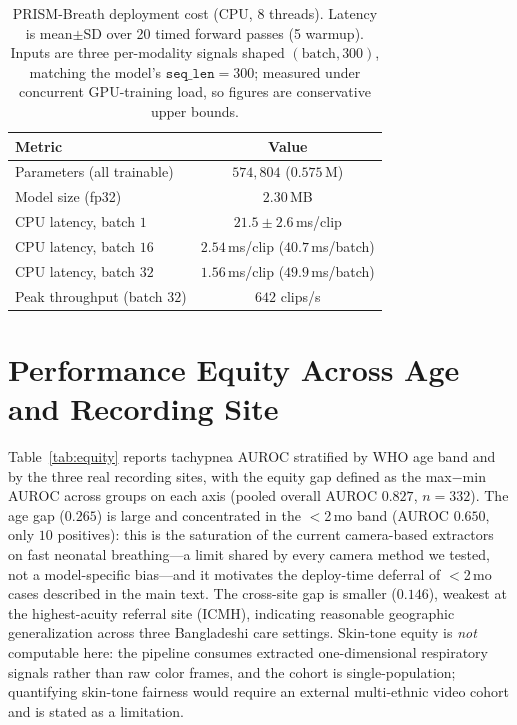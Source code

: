 \begin{table}[!t]
\caption{PRISM-Breath deployment cost (CPU, 8 threads). Latency is mean$\pm$SD over 20 timed forward passes
(5 warmup). Inputs are three per-modality signals shaped $(\text{batch},300)$, matching the model's
$\texttt{seq\_len}{=}300$; measured under concurrent GPU-training load, so figures are conservative upper
bounds.}
\label{tab:edge}\centering\small
\begin{tabular}{@{}lc@{}}\toprule
Metric & Value\\\midrule
Parameters (all trainable)      & $574{,}804$ \;($0.575$\,M) \\
Model size (fp32)               & $2.30$\,MB \\
CPU latency, batch $1$          & $21.5 \pm 2.6$\,ms/clip \\
CPU latency, batch $16$         & $2.54$\,ms/clip \;($40.7$\,ms/batch) \\
CPU latency, batch $32$         & $1.56$\,ms/clip \;($49.9$\,ms/batch) \\
Peak throughput (batch $32$)    & $642$ clips/s \\\bottomrule
\end{tabular}
\end{table}

\section{Performance Equity Across Age and Recording Site}
\label{sec:equity}
Table~\ref{tab:equity} reports tachypnea AUROC stratified by WHO age band and by the three real recording
sites, with the equity gap defined as the max$-$min AUROC across groups on each axis (pooled overall AUROC
$0.827$, $n{=}332$). The age gap ($0.265$) is large and concentrated in the $<$2\,mo band (AUROC $0.650$,
only $10$ positives): this is the saturation of the current camera-based extractors on fast neonatal
breathing---a limit shared by every camera method we tested, not a model-specific bias---and it motivates the
deploy-time deferral of $<$2\,mo cases described in the main text. The cross-site gap is smaller ($0.146$),
weakest at the highest-acuity referral site (ICMH), indicating reasonable geographic generalization across
three Bangladeshi care settings. Skin-tone equity is \emph{not} computable here: the pipeline consumes
extracted one-dimensional respiratory signals rather than raw color frames, and the cohort is
single-population; quantifying skin-tone fairness would require an external multi-ethnic video cohort and
is stated as a limitation.

